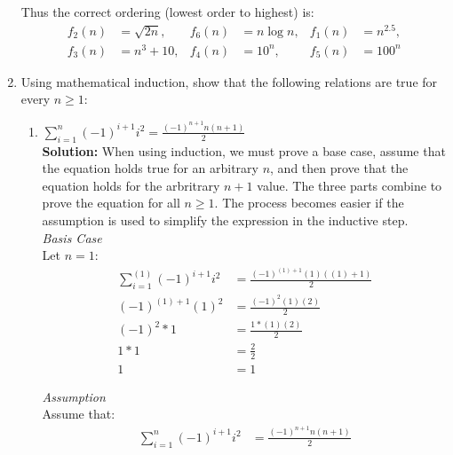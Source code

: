 \documentclass[11pts]{article}
\begin{document}
\begin{enumerate}
  Thus the correct ordering (lowest order to highest) is:
  \begin{align*}
  f_2(n) &= \sqrt{2n}, & f_6(n) &= n \log n,  & f_1(n) &= n^{2.5},     \\
  f_3(n) &= n^3 + 10,  & f_4(n) &= 10^{n},    & f_5(n) &= 100^{n}
  \end{align*}
  \newpage

\item Using mathematical induction, show that the following relations are true
for every $n\ge1$:

  \begin {enumerate}
  \item $ \sum_{i=1}^{n}{(-1)^{i+1}i^2} = \frac{(-1)^{n+1}n(n+1)}{2} $ \\

  \textbf{Solution:} When using induction, we must prove a base case,
  assume that the equation holds true for an arbitrary $n$, and then prove
  that the equation holds for the arbritrary $n+1$ value. The three parts
  combine to prove the equation for all $n\ge1$. The process becomes easier
  if the assumption is used to simplify the expression in the inductive step.\\

  \textit{Basis Case}\\
  Let $n=1$:
  \begin{align*}
  \sum_{i=1}^{(1)}{(-1)^{i+1}i^2} &= \frac{(-1)^{(1)+1}(1)((1)+1)}{2} \\
                (-1)^{(1)+1}(1)^2 &= \frac{(-1)^{2}(1)(2)}{2} \\
                       (-1)^{2}*1 &= \frac{1 * (1)(2)}{2} \\
                              1*1 &= \frac{2}{2} \\
                                1 &= 1
  \end{align*}

  \textit{Assumption}\\
  Assume that:
  \begin{align*}
  \sum_{i=1}^{n}{(-1)^{i+1}i^2} &= \frac{(-1)^{n+1}n(n+1)}{2}
  \end{align*}


\end{enumerate}
\end{enumerate}
\end{document}
